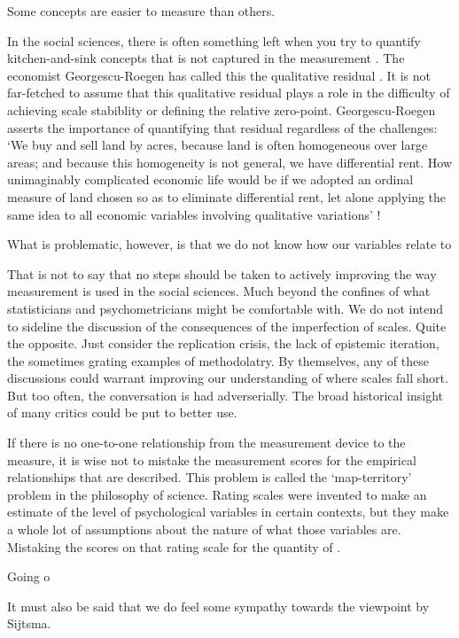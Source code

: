 \documentclass[utf8]{FrontiersinVancouver}
\begin{document}
Some concepts are easier to measure than others. 

In the social sciences, there is often something left when you try to quantify kitchen-and-sink concepts that is not captured in the measurement \citep{}. The economist Georgescu-Roegen has called this the qualitative residual \citep{georgescu-roegenMeasureQualityOptimum1965}. It is not far-fetched to assume that this qualitative residual plays a role in the difficulty of achieving scale stabiblity or defining the relative zero-point. Georgescu-Roegen asserts the importance of quantifying that residual regardless of the challenges: `We buy and sell land by acres, because land is often homogeneous over large areas; and because this homogeneity is not general, we have differential rent. How unimaginably complicated economic life would be if we adopted an ordinal measure of land chosen so as to eliminate differential rent, let alone applying the same idea to all economic variables involving qualitative variations' \citep{georgescu-roegenMeasureQualityOptimum1965}!


What is problematic, however, is that we do not know how our variables relate to 

That is not to say that no steps should be taken to actively improving the way measurement is used in the social sciences. Much beyond the confines of what statisticians and psychometricians might be comfortable with. We do not intend to sideline the discussion of the consequences of the imperfection of scales. Quite the opposite. Just consider the replication crisis, the lack of epistemic iteration, the sometimes grating examples of methodolatry. By themselves, any of these discussions could warrant improving our understanding of where scales fall short. But too often, the conversation is had adverserially. The broad historical insight of many critics could be put to better use. 

If there is no one-to-one relationship from the measurement device to the measure, it is wise not to mistake the measurement scores for the empirical relationships that are described. This problem is called the `map-territory' problem in the philosophy of science. Rating scales were invented to make an estimate of the level of psychological variables in certain contexts, but they make a whole lot of assumptions about the nature of what those variables are. Mistaking the scores on that rating scale for the quantity of . 

Going o

It must also be said that we do feel some sympathy towards the viewpoint by Sijtsma\citep{sijtsmaPsychologicalMeasurementPhysics2012}. 
\end{document}
